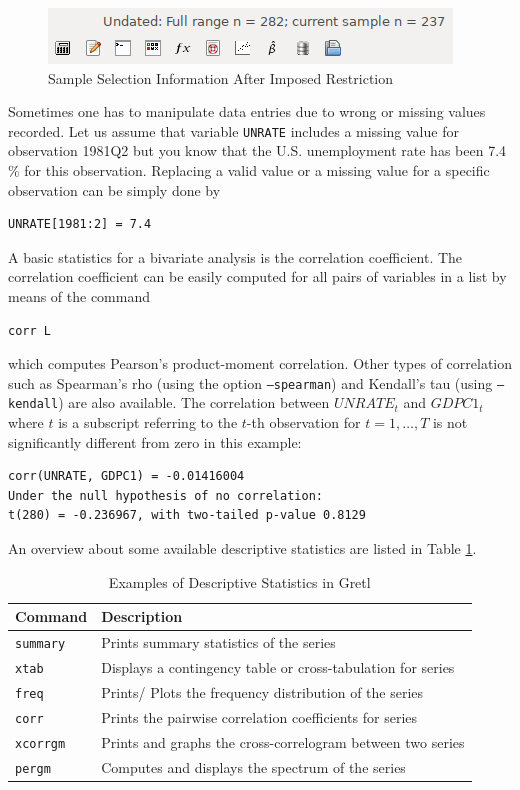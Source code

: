 \documentclass[11pt]{article}
\begin{document}
\begin{figure}[!h]
	\centering
	\includegraphics[width=.42\textwidth]{../figures/smpl_restrict}
	\caption{Sample Selection Information After Imposed Restriction}
	\label{fig:smpl}
\end{figure}

Sometimes one has to manipulate data entries due to wrong or missing values recorded. Let us assume that variable \texttt{UNRATE} includes a missing value for observation 1981Q2 but you know that the U.S. unemployment rate has been 7.4 \% for this observation. Replacing a valid value or a missing value for a specific observation can be simply done by 
\begin{verbatim}
UNRATE[1981:2] = 7.4
\end{verbatim}

A basic statistics for a bivariate analysis is the correlation coefficient. The correlation coefficient can be easily computed for all pairs of variables in a list by means of the command
\begin{verbatim}
corr L
\end{verbatim}
which computes Pearson's product-moment correlation. Other types of correlation such as Spearman's rho (using the option \texttt{---spearman}) and Kendall's tau (using \texttt{---kendall}) are also available. The correlation between $UNRATE_t$ and $GDPC1_t$ where $ t $ is a subscript referring to the $ t $-th observation for $ t=1,\ldots, T $ is not significantly different from zero in this example:
\begin{Verbatim}[baselinestretch=0.75]
corr(UNRATE, GDPC1) = -0.01416004
Under the null hypothesis of no correlation:
t(280) = -0.236967, with two-tailed p-value 0.8129
\end{Verbatim}

An overview about some available descriptive statistics are listed in Table \ref{tab:descriptive}.

\begin{table}[!h]
	\centering
	\footnotesize
	\begin{tabular}{ll}
		\hline
		Command & Description \\ 
		\hline 
		\texttt{summary} & Prints summary statistics of the series \\
		\texttt{xtab} & Displays a contingency table or cross-tabulation for series\\ 
		\texttt{freq} & Prints/ Plots the frequency distribution of the series \\
		\texttt{corr} & Prints the pairwise correlation coefficients for series\\
		\texttt{xcorrgm} & Prints and graphs the cross-correlogram between two series \\
		\texttt{pergm} & Computes and displays the spectrum of the series \\
		\hline 
	\end{tabular}
	\caption{Examples of Descriptive Statistics in Gretl}
	\label{tab:descriptive}
\end{table}
\end{document}
